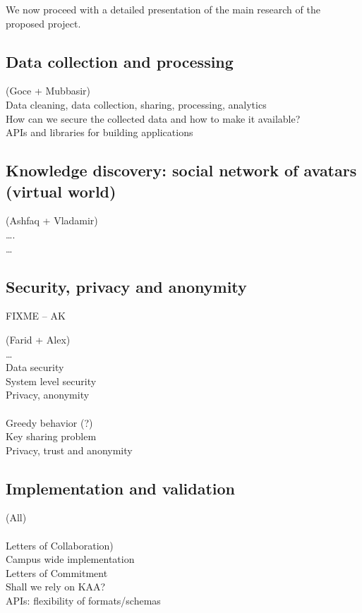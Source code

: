 We now proceed with a detailed presentation of the main research of the proposed project. 


\subsection{Data collection and processing} 
(Goce + Mubbasir)\\
Data cleaning, data collection, sharing, processing, analytics\\
How can we secure the collected data and how to make it available?\\
APIs and libraries for building applications 


 

\subsection{Knowledge discovery: social network of avatars (virtual world)}
(Ashfaq + Vladamir)\\
….\\
…\\

\subsection{Security, privacy and anonymity}

FIXME -- AK

(Farid + Alex)\\
…\\
Data security\\
System level security\\
Privacy, anonymity\\
\\
Greedy behavior (?)\\
Key sharing problem\\ 
Privacy, trust and anonymity \\

\subsection{Implementation and validation }
(All)\\
\\
Letters of Collaboration)\\
Campus wide implementation \\
Letters of Commitment\\
Shall we rely on KAA?\\
APIs: flexibility of formats/schemas\\

 
